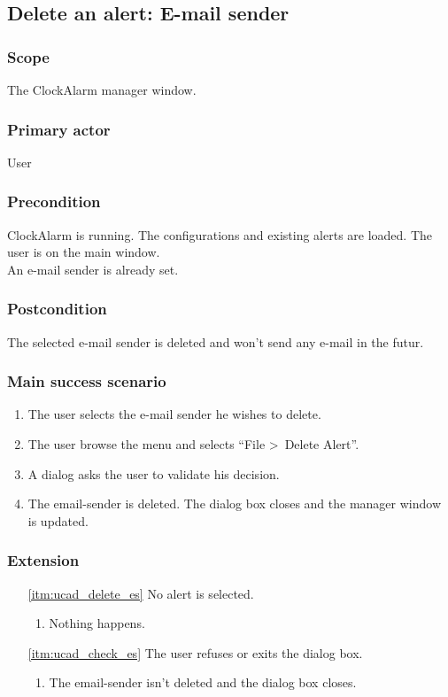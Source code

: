 \subsection{Delete an alert: E-mail sender}

\subsubsection{Scope}
The ClockAlarm manager window.
\subsubsection{Primary actor}
User
\subsubsection{Precondition}
ClockAlarm is running. The configurations and existing alerts are loaded. The user is on the main window.
\\An e-mail sender is already set.
\subsubsection{Postcondition}
The selected e-mail sender is deleted and won't send any e-mail in the futur.
\subsubsection{Main success scenario}
\begin{enumerate}
	\item The user selects the e-mail sender he wishes to delete.
	\item \label{itm:ucad_delete_es} The user browse the menu and selects ``File \textgreater~Delete Alert''.
	\item \label{itm:ucad_check_es} A dialog asks the user to validate his decision.
	\item The email-sender is deleted. The dialog box closes and the manager window is updated.
\end{enumerate}
\subsubsection{Extension}
\begin{enumerate}
	\item[\ref{itm:ucad_delete_es}] No alert is selected.
	\begin{enumerate}[i]
		\item Nothing happens.
	\end{enumerate}
	
	\item[\ref{itm:ucad_check_es}] The user refuses or exits the dialog box.
	\begin{enumerate}[i]
		\item The email-sender isn't deleted and the dialog box closes.
	\end{enumerate}
\end{enumerate}